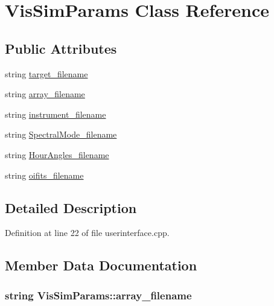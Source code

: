 \hypertarget{classVisSimParams}{
\section{VisSimParams Class Reference}
\label{classVisSimParams}
}
\subsection*{Public Attributes}
\begin{DoxyCompactItemize}
\item 
string \hyperlink{classVisSimParams_a225b522f1b7e0e07bb3745456693d84d}{target\_\-filename}
\item 
string \hyperlink{classVisSimParams_ad4024dfafa47b1c4246c1885be3bd77e}{array\_\-filename}
\item 
string \hyperlink{classVisSimParams_a1b39663100b7215fc5d8f61d30d85044}{instrument\_\-filename}
\item 
string \hyperlink{classVisSimParams_a5b4b6a34093cd8d538fa32e159477d8e}{SpectralMode\_\-filename}
\item 
string \hyperlink{classVisSimParams_a6e44268b31963634fc2a2a6ec96c0d67}{HourAngles\_\-filename}
\item 
string \hyperlink{classVisSimParams_ab5550741409f4dbfe5d601194fe7be4b}{oifits\_\-filename}
\end{DoxyCompactItemize}


\subsection{Detailed Description}


Definition at line 22 of file userinterface.cpp.



\subsection{Member Data Documentation}
\hypertarget{classVisSimParams_ad4024dfafa47b1c4246c1885be3bd77e}{
\subsubsection[{array\_\-filename}]{\setlength{\rightskip}{0pt plus 5cm}string {\bf VisSimParams::array\_\-filename}}}
\label{classVisSimParams_ad4024dfafa47b1c4246c1885be3bd77e}


